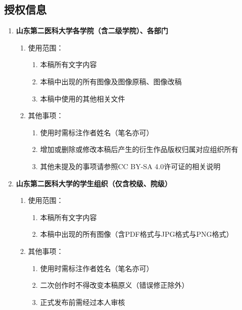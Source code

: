 \subsection[授权信息]{授权信息}
\begin{enumerate}
    \item \textbf{山东第二医科大学各学院（含二级学院）、各部门}
          \begin{enumerate}
              \item 使用范围：
                    \begin{enumerate}
                        \item 本稿所有文字内容
                        \item 本稿中出现的所有图像及图像原稿、图像改稿
                        \item 本稿中使用的其他相关文件
                    \end{enumerate}
              \item 其他事项：
                    \begin{enumerate}
                        \item 使用时需标注作者姓名（笔名亦可）
                        \item 增加或删除或修改本稿后产生的衍生作品版权归属对应组织所有
                        \item 其他未提及的事项请参照CC BY-SA 4.0许可证的相关说明
                    \end{enumerate}
          \end{enumerate}
    \item \textbf{山东第二医科大学的学生组织（仅含校级、院级）}
          \begin{enumerate}
              \item 使用范围：
                    \begin{enumerate}
                        \item 本稿所有文字内容
                        \item 本稿中出现的所有图像（含PDF格式与JPG格式与PNG格式）
                    \end{enumerate}
              \item 其他事项：
                    \begin{enumerate}
                        \item 使用时需标注作者姓名（笔名亦可）
                        \item 二次创作时不得改变本稿原义（错误修正除外）
                        \item 正式发布前需经过本人审核

\end{enumerate}
\end{enumerate}
\end{enumerate}

